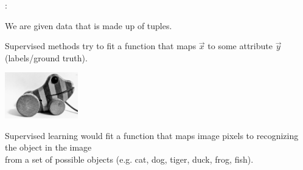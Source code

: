 \begin{frame}{\secname:~\subsecname}

We are given data that is made up of tuples.

Supervised methods try to fit a function that maps $\vec x$ to some attribute $\vec y$ (labels/ground truth).

\begin{center}
	\includegraphics[height=2cm]{img/tigerente}
\end{center}

Supervised learning would fit a function that maps image pixels to recognizing the object in the image\\
from a set of possible objects (e.g. cat, dog, tiger, duck, frog, fish).
    
\end{frame}

